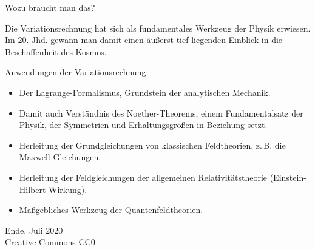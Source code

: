 \documentclass{beamer}
\newcommand{\modest}[1]{{\small\color{gray}#1}}
\begin{document}
\begin{frame}
Wozu braucht man das?\pause

\vspace{0.8em}
Die Variationsrechnung hat sich als fundamentales Werkzeug der Physik
erwiesen. Im 20. Jhd. gewann man damit einen äußerst tief liegenden
Einblick in die Beschaffenheit des Kosmos.
\end{frame}

\begin{frame}
Anwendungen der Variationsrechnung:
\begin{itemize}
\item Der Lagrange-Formalismus, Grundstein der analytischen Mechanik.

\item Damit auch Verständnis des Noether-Theorems, einem
Fundamentalsatz der Physik, der Symmetrien und Erhaltungsgrößen
in Beziehung setzt.

\item Herleitung der Grundgleichungen von klassischen Feldtheorien,
z.\,B. die Maxwell-Gleichungen.

\item Herleitung der Feldgleichungen der allgemeinen
Relativitätstheorie (Einstein-Hilbert-Wirkung).

\item Maßgebliches Werkzeug der Quantenfeldtheorien.
\end{itemize}
\end{frame}

\begin{frame}
Ende.
\vfill\hfill\modest{Juli 2020}\\
\hfill\modest{Creative Commons CC0}
\end{frame}
\end{document}

